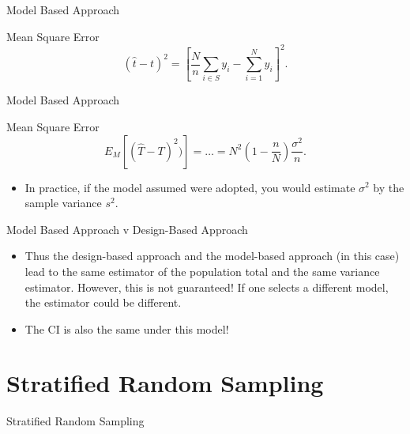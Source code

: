 \documentclass[10pt]{beamer}\usepackage[]{graphicx}\usepackage[]{xcolor}
\begin{document}
\begin{frame}{Model Based Approach}
\begin{block}{Mean Square Error}
$$(\hat{t} -t)^2 = \left[ \frac{N}{n} \sum_{i \in S} y_i - \sum_{i=1}^N y_i \right]^2.$$
\end{block}
\end{frame}

\begin{frame}{Model Based Approach}
\begin{block}{Mean Square Error}
$$E_M\left[ (\hat{T}-T)^2)\right] = \dots = N^2(1-\frac{n}{N}) \frac{\sigma^2}{n}.$$
\end{block}
\begin{itemize}
\item In practice, if the model assumed were adopted, you would estimate $\sigma^2$ by the sample variance $s^2$.
\end{itemize}
\end{frame}


\begin{frame}{Model Based Approach v Design-Based Approach}
\begin{itemize}
\item Thus the design-based approach and the model-based approach (in this case) lead to the same estimator of the population total and the same variance estimator. However, this is not guaranteed! If one selects a different model, the estimator could be different.
\item The CI is also the same under this model!
\end{itemize}
\end{frame}


\section{Stratified Random Sampling}

\begin{frame}{}
\begin{block}{}
\begin{center}
Stratified Random Sampling
\end{center}
\end{block}
\end{frame}
\end{document}
